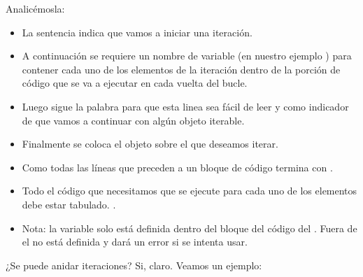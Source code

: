 \documentclass[a4paper,12pt,spanish]{sphinxmanual}
\begin{document}
\sphinxAtStartPar
Analicémosla:
\begin{itemize}
\item {} 
\sphinxAtStartPar
La sentencia  indica que vamos a iniciar una iteración.

\item {} 
\sphinxAtStartPar
A continuación se requiere un nombre de variable (en nuestro
ejemplo ) para contener cada uno de los elementos de la iteración
dentro de la porción de código que se va a ejecutar en cada vuelta del bucle.

\item {} 
\sphinxAtStartPar
Luego sigue la palabra  para que esta linea sea fácil de leer y como
indicador de que vamos a continuar con algún objeto iterable.

\item {} 
\sphinxAtStartPar
Finalmente se coloca el objeto sobre el que deseamos iterar.

\item {} 
\sphinxAtStartPar
Como todas las líneas que preceden a un bloque de código termina con \sphinxcode{\sphinxupquote{:}}.

\item {} 
\sphinxAtStartPar
Todo el código que necesitamos que se ejecute para cada uno de los elementos
debe estar tabulado. .

\item {} 
\sphinxAtStartPar
Nota: la variable  solo está definida dentro del bloque del
código del . Fuera de el no está definida y dará un error si se
intenta usar.

\end{itemize}

\sphinxAtStartPar
¿Se puede anidar iteraciones?
Si, claro. Veamos un ejemplo:

\begin{sphinxVerbatim}[commandchars=\\\{\}]
  \PYG{p}{[} \PYG{p}{[} \PYG{p}{]} \PYG{p}{[} \PYG{p}{]} \PYG{p}{[} \PYG{p}{]} \PYG{p}{]}

   
       

\end{sphinxVerbatim}
\end{document}
